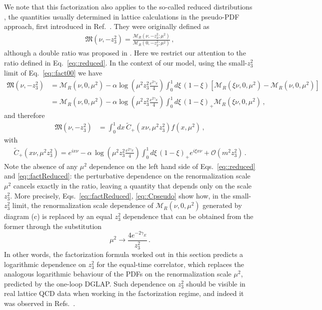 We note that this factorization also applies to the so-called reduced
distributions \cite{Zhang:2018ggy,Radyushkin:2018cvn}, the quantities usually
determined in lattice calculations in the pseudo-PDF approach, first introduced
in Ref.~\cite{Radyushkin:2017cyf}. They were originally defined as
\begin{align}
\label{eq::reduced}
	\mathfrak{M}\left(\nu,-z_3^2\right) =
	\frac{\mathcal{M}_R\left(\nu, -z_3^2; \mu^2\right)}{\mathcal{M}_R\left(0, -z_3^2; \mu^2\right)}\,,
\end{align}
although a double ratio was proposed in \cite{Orginos:2017kos}. Here we restrict our attention to the ratio defined in Eq.~\eqref{eq::reduced}.
In the context of our model, using the small-$z_3^2$ limit of Eq.~\eqref{eq::fact00} we have
\begin{align}
	\mathfrak{M}\left(\nu,-z_3^2\right) &= 
	\mathcal{M}_R\left(\nu,0, \mu^2\right)  
	-\alpha \log\left( \mu^2 z_3^2\frac{e^{2\gamma_E}}{4} \right) \int_0^1 d\xi\,\left(1-\xi\right)  
	\left[\mathcal{M}_R\left(\xi \nu,0,\mu^2\right)- \mathcal{M}_R\left(\nu,0,\mu^2\right) \right] \nonumber \\
	& = \mathcal{M}_R\left(\nu, 0, \mu^2\right)  
	-\alpha \log\left( \mu^2 z_3^2\frac{e^{2\gamma_E}}{4} \right) \int_0^1 d\xi\,\left(1-\xi\right)_+ 
	\mathcal{M}_R\left(\xi \nu,0, \mu^2\right)\, ,
\end{align}
and therefore
\begin{align}
	\label{eq::factReduced}
	\mathfrak{M}\left(\nu,-z_3^2\right) &=  
	\int_{0}^{1} dx \, \tilde{C}_+\left(x\nu,\mu^2 z_3^2 \right) f\left(x,\mu^2\right)\,,
\end{align}
with
\begin{align}
	\label{eq::Cpseudo}
	\tilde{C}_+\left(x\nu,\mu^2 z_3^2 \right) =
	 e^{i x\nu} - \alpha\,\log\left( \mu^2 z_3^2\frac{e^{2\gamma_E}}{4} \right)
	 \int_0^1 d\xi \, \left(1-\xi\right)_+ e^{i \xi x\nu} + \mathcal{O}\left(m^2 z_3^2\right)\, .
\end{align}
Note the absence of any $\mu^2$ dependence on the left hand side of
Eqs.~\eqref{eq::reduced} and \eqref{eq::factReduced}: the perturbative
dependence on the renormalization scale $\mu^2$ cancels exactly in the ratio,
leaving a quantity that depends only on the scale $z_3^2$. More precisely,
Eqs.~\eqref{eq::factReduced}, \eqref{eq::Cpseudo} show how, in the small-$z_3^2$
limit, the renormalization scale dependence of
$\mathcal{M}_R\left(\nu,0,\mu^2\right)$ generated by diagram (c) is replaced by
an equal $z_3^2$ dependence that can be obtained from the former through the
substitution  
$$\mu^2 \rightarrow \frac{4 e^{-2\gamma_E}}{z_3^2}\, .$$ In other words, the
factorization formula worked out in this section predicts a logarithmic
dependence on $z_3^2$ for the equal-time correlator, which replaces the
analogous logarithmic behaviour of the PDFs on the renormalization scale
$\mu^2$, predicted by the one-loop DGLAP. Such dependence on $z_3^2$ should be
visible in real lattice QCD data when working in the factorization regime, and
indeed it was observed in Refs.~\cite{Radyushkin:2018cvn, Orginos:2017kos}.


